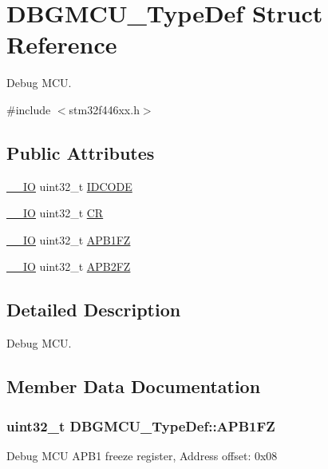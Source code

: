 \hypertarget{struct_d_b_g_m_c_u___type_def}{}\section{D\+B\+G\+M\+C\+U\+\_\+\+Type\+Def Struct Reference}
\label{struct_d_b_g_m_c_u___type_def}


Debug M\+CU.  




{\ttfamily \#include $<$stm32f446xx.\+h$>$}

\subsection*{Public Attributes}
\begin{DoxyCompactItemize}
\item 
\hyperlink{core__sc300_8h_aec43007d9998a0a0e01faede4133d6be}{\+\_\+\+\_\+\+IO} uint32\+\_\+t \hyperlink{struct_d_b_g_m_c_u___type_def_a0cc3561c124d06bb57dfa855e43ed99f}{I\+D\+C\+O\+DE}
\item 
\hyperlink{core__sc300_8h_aec43007d9998a0a0e01faede4133d6be}{\+\_\+\+\_\+\+IO} uint32\+\_\+t \hyperlink{struct_d_b_g_m_c_u___type_def_a15981828f2b915d38570cf6684e99a53}{CR}
\item 
\hyperlink{core__sc300_8h_aec43007d9998a0a0e01faede4133d6be}{\+\_\+\+\_\+\+IO} uint32\+\_\+t \hyperlink{struct_d_b_g_m_c_u___type_def_aac341c7e09cd5224327eeb7d9f122bed}{A\+P\+B1\+FZ}
\item 
\hyperlink{core__sc300_8h_aec43007d9998a0a0e01faede4133d6be}{\+\_\+\+\_\+\+IO} uint32\+\_\+t \hyperlink{struct_d_b_g_m_c_u___type_def_a011f892d86367dbe786964b14bc515a6}{A\+P\+B2\+FZ}
\end{DoxyCompactItemize}


\subsection{Detailed Description}
Debug M\+CU. 

\subsection{Member Data Documentation}
\subsubsection[{\texorpdfstring{A\+P\+B1\+FZ}{APB1FZ}}]{ uint32\+\_\+t D\+B\+G\+M\+C\+U\+\_\+\+Type\+Def\+::\+A\+P\+B1\+FZ}\hypertarget{struct_d_b_g_m_c_u___type_def_aac341c7e09cd5224327eeb7d9f122bed}{}\label{struct_d_b_g_m_c_u___type_def_aac341c7e09cd5224327eeb7d9f122bed}
Debug M\+CU A\+P\+B1 freeze register, Address offset\+: 0x08 
